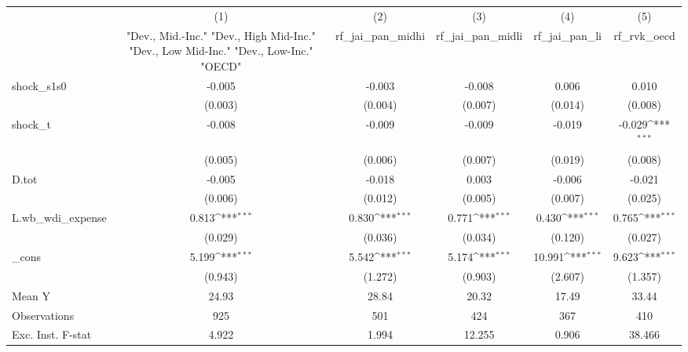{
\def\sym#1{\ifmmode^{#1}\else\(^{#1}\)\fi}
\begin{tabular}{l*{5}{c}}
\toprule
            &\multicolumn{1}{c}{(1)}&\multicolumn{1}{c}{(2)}&\multicolumn{1}{c}{(3)}&\multicolumn{1}{c}{(4)}&\multicolumn{1}{c}{(5)}\\
            &\multicolumn{1}{c}{ "Dev., Mid.-Inc." "Dev., High Mid-Inc." "Dev., Low Mid-Inc." "Dev., Low-Inc." "OECD" }&\multicolumn{1}{c}{rf\_jai\_pan\_midhi}&\multicolumn{1}{c}{rf\_jai\_pan\_midli}&\multicolumn{1}{c}{rf\_jai\_pan\_li}&\multicolumn{1}{c}{rf\_rvk\_oecd}\\
\midrule
shock\_s1s0  &      -0.005         &      -0.003         &      -0.008         &       0.006         &       0.010         \\
            &     (0.003)         &     (0.004)         &     (0.007)         &     (0.014)         &     (0.008)         \\
\addlinespace
shock\_t     &      -0.008         &      -0.009         &      -0.009         &      -0.019         &      -0.029\sym{***}\\
            &     (0.005)         &     (0.006)         &     (0.007)         &     (0.019)         &     (0.008)         \\
\addlinespace
D.tot       &      -0.005         &      -0.018         &       0.003         &      -0.006         &      -0.021         \\
            &     (0.006)         &     (0.012)         &     (0.005)         &     (0.007)         &     (0.025)         \\
\addlinespace
L.wb\_wdi\_expense&       0.813\sym{***}&       0.830\sym{***}&       0.771\sym{***}&       0.430\sym{***}&       0.765\sym{***}\\
            &     (0.029)         &     (0.036)         &     (0.034)         &     (0.120)         &     (0.027)         \\
\addlinespace
\_cons      &       5.199\sym{***}&       5.542\sym{***}&       5.174\sym{***}&      10.991\sym{***}&       9.623\sym{***}\\
            &     (0.943)         &     (1.272)         &     (0.903)         &     (2.607)         &     (1.357)         \\
\midrule
Mean Y      &       24.93         &       28.84         &       20.32         &       17.49         &       33.44         \\
Observations&         925         &         501         &         424         &         367         &         410         \\
Exc. Inst. F-stat&       4.922         &       1.994         &      12.255         &       0.906         &      38.466         \\
\bottomrule
\end{tabular}
}

